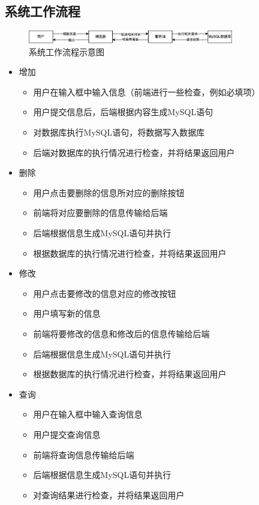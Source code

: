 \documentclass{article}
\begin{document}
    \subsection{系统工作流程}
    \begin{figure}[H]
        \centering
        \includegraphics[width=0.8\textwidth]{./fig/working_pipeline.png}
        \caption[working_pipeline]{系统工作流程示意图}
    \end{figure}
    \begin{itemize}
        \item 增加
        \begin{itemize}
            \item 用户在输入框中输入信息（前端进行一些检查，例如必填项）
            \item 用户提交信息后，后端根据内容生成MySQL语句
            \item 对数据库执行MySQL语句，将数据写入数据库
            \item 后端对数据库的执行情况进行检查，并将结果返回用户
        \end{itemize}
        \item 删除
        \begin{itemize}
            \item 用户点击要删除的信息所对应的删除按钮
            \item 前端将对应要删除的信息传输给后端
            \item 后端根据信息生成MySQL语句并执行
            \item 根据数据库的执行情况进行检查，并将结果返回用户
        \end{itemize}
        \item 修改
        \begin{itemize}
            \item 用户点击要修改的信息对应的修改按钮
            \item 用户填写新的信息
            \item 前端将要修改的信息和修改后的信息传输给后端
            \item 后端根据信息生成MySQL语句并执行
            \item 根据数据库的执行情况进行检查，并将结果返回用户
        \end{itemize}
        \item 查询
        \begin{itemize}
            \item 用户在输入框中输入查询信息
            \item 用户提交查询信息
            \item 前端将查询信息传输给后端
            \item 后端根据信息生成MySQL语句并执行
            \item 对查询结果进行检查，并将结果返回用户
        \end{itemize}
    \end{itemize}
\end{document}
